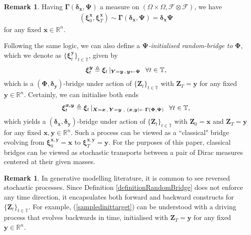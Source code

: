 \documentclass{article}
\def\R{\mathbb{R}}
\def\T{\mathbb{T}}
\def\F{\mathcal{F}}
\def\xib{\boldsymbol{\xi}}
\theoremstyle{definition}
\newtheorem{remark}[proposition]{Remark}
\begin{document}
\begin{remark}
Having $\boldsymbol{\Gamma}(\boldsymbol{\delta}_{\boldsymbol{x}},\boldsymbol{\Psi})$ a measure on $(\Omega \times \Omega, \F \otimes \F)$, we have
\begin{align}
(\xib^{\boldsymbol{x}}_0,\xib^{\boldsymbol{x}}_T) \sim \boldsymbol{\Gamma}(\boldsymbol{\delta}_{\boldsymbol{x}},\boldsymbol{\Psi}) = \boldsymbol{\delta}_{\boldsymbol{x}}\boldsymbol{\Psi}
\end{align}
for  any fixed $\boldsymbol{x}\in\R^n$.
\end{remark}
Following the same logic, we can also define a \emph{$\boldsymbol{\Psi}$-initialised random-bridge to $\boldsymbol{\Phi}$}, which we denote as $\{\xib^{\boldsymbol{y}}_t\}_{t\in\T}$, given by
\begin{align}
\xib^{\boldsymbol{y}}_t \triangleq  \xib_t \, |_{\boldsymbol{Y} = \boldsymbol{y} \, , \,\boldsymbol{y} \leftarrow \boldsymbol{\Psi}} \hspace{0.1in} \forall t\in\T, \label{sampledinittarget}
\end{align}
which is a $(\boldsymbol{\Phi},\boldsymbol{\delta}_{\boldsymbol{y}})$-bridge under action of $\{\boldsymbol{Z}_t\}_{t\in\T}$ with $\boldsymbol{Z}_T =\boldsymbol{y}$ for any fixed $\boldsymbol{y}\in\R^n$. Certainly, we can initialise both ends
\begin{align}
\xib^{\boldsymbol{x,y}}_t \triangleq  \xib_t \, |_{\boldsymbol{X} = \boldsymbol{x} \, , \, \boldsymbol{Y} = \boldsymbol{y} \,\, , \,\, (\boldsymbol{x},\boldsymbol{y}) \leftarrow \boldsymbol{\Gamma}(\boldsymbol{\Phi},\boldsymbol{\Psi})} \hspace{0.1in} \forall t\in\T, \label{purebridgeconstruct}
\end{align}
which yields a $(\boldsymbol{\delta}_{\boldsymbol{x}},\boldsymbol{\delta}_{\boldsymbol{y}})$-bridge under action of $\{\boldsymbol{Z}_t\}_{t\in\T}$ with $\boldsymbol{Z}_0 =\boldsymbol{x}$ and $\boldsymbol{Z}_T =\boldsymbol{y}$ for any fixed $\boldsymbol{x},\boldsymbol{y}\in\R^n$. Such a process can be viewed as a ``classical" bridge evolving from $\xib^{\boldsymbol{x,y}}_0 = \boldsymbol{x}$ to $\xib^{\boldsymbol{x,y}}_T = \boldsymbol{y}$. For the purposes of this paper, classical bridges can be viewed as stochastic transports between a pair of Dirac measures centered at their given masses.
\begin{remark}
In generative modelling literature, it is common to see reversed stochastic processes. Since Definition \ref{definitionRandomBridge} does not enforce any time direction, it encapsulates both forward and backward constructs for $\{\boldsymbol{Z}_t\}_{t\in\T}$. For example, (\ref{sampledinittarget}) can be understood with a driving process that evolves backwards in time, initialised with $\boldsymbol{Z}_T =\boldsymbol{y}$ for any fixed $\boldsymbol{y}\in\R^n$.
\end{remark}
\end{document}
